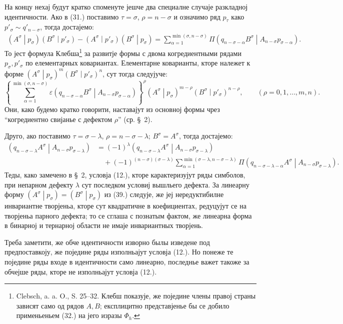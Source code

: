 ﻿\documentclass[11pt]{article}
\newcommand{\pair}[2]{\left(#1\middle|#2\right)}
\newcommand{\eps}{\varepsilon}
\begin{document}
На концу нехај будут кратко споменуте јешче два специалне случаје разкладној идентичности. Ако в (31.) поставимо $\tau=\sigma$, $\rho=n-\sigma$ и означимо ряд $p_\tau$ како $p'_\sigma\sim q'_{n-\sigma}$, тогда достајемо:
\begin{equation}
\begin{aligned}
\pair{A^\sigma}{p_\sigma}\pair{B^\sigma}{p'_\sigma}
-\pair{A^\sigma}{p'_\sigma}\pair{B^\sigma}{p_\sigma}
=\sum_{\alpha=1}^{\min(\sigma,n-\sigma)}
\Pi\pair{q_{n-\sigma-\alpha}B^\sigma}{A_{n-\sigma}p_{\sigma-\alpha}}.
\end{aligned}
\tag{37}
\end{equation}
То јест формула Клебша\footnote{Clebsch, a. a. O., S. 25--32. Клебш показује, же поједине члены правој страны зависят само од рядов $A,B$; експлицитно представјенье бы се добило применьеньем (32.) на јего изразы $\Phi_h$.} за развитје формы с двома когредиентными рядами $p_\sigma,p'_\sigma$ по елементарных ковариантах. Елементарне коварианты, кторе належет к форме $\pair{A^\sigma}{p_\sigma}^m\pair{B^\sigma}{p'_\sigma}^n$, сут тогда следујуче:
\begin{equation}
 \left\{\sum_{\alpha=1}^{\min(\sigma,n-\sigma)}
 \eps\pair{q_{n-\sigma-\alpha}B^\sigma}{A_{n-\sigma}p_{\sigma-\alpha}}
 \right\}^{\rho}
 \pair{A^\sigma}{p_\sigma}^{m-\rho}\pair{B^\sigma}{p'_\sigma}^{n-\rho},
 \qquad (\rho=0,1,\ldots,m,n).
\tag{38}
\end{equation}
Они, како будемо кратко говорити, наставајут из основној формы чрез ``когредиентно свијанье с дефектом $\rho$'' (ср. \S\ 2).

Друго, ако поставимо $\tau=\sigma-\lambda$, $\rho=n-\sigma-\lambda$; $B^\sigma=A^\sigma$, тогда достајемо:
\begin{equation}
\begin{aligned}
\pair{q_{n-\sigma-\lambda}A^\sigma}{A_{n-\sigma}p_{\sigma-\lambda}}
&=(-1)^\lambda
\pair{q_{n-\sigma-\lambda}A^\sigma}{A_{n-\sigma}p_{\sigma-\lambda}}\\
&\quad+(-1)^{(n-\sigma)(\sigma-\lambda)}
 \sum_{\alpha=1}^{\min(\sigma-\lambda,n-\sigma-\lambda)}
 \Pi\pair{q_{n-\sigma-\lambda-\alpha}A^\sigma}
 {A_{n-\sigma}p_{\sigma-\lambda}}.
\end{aligned}
\tag{39}
\end{equation}
Теды, како замечено в \S\ 2, условја (12.), кторе карактеризујут ряды симболов, при непарном дефекту $\lambda$ сут последком условиј вышльего дефекта. За линеарну форму $\pair{A^\sigma}{p_\sigma}=\pair{B^\sigma}{p_\sigma}$ из (39.) следује, же јеј нередуктибилне инвариантне творјеньа, кторе сут квадратичне в коефициентах, редуцујут се на творјеньа парного дефекта; то се сглаша с познатым фактом, же линеарна форма в бинарној и тернарној области не имаје инвариантных творјень.

Треба заметити, же обче идентичности изворно былы изведене под предпоставкоју, же поједине ряды изполньајут условја (12.). Но понеже те поједине ряды входе в идентичности само линеарно, последнье важет такоже за обчејше ряды, кторе не изполньајут условја (12.).
\end{document}

